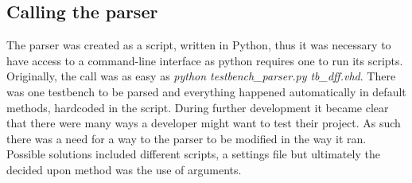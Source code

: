 \documentclass[11pt,british]{article}
\begin{document}
\subsection{Calling the parser}
The parser was created as a script, written in Python, thus it was necessary to have access to a command-line interface as python requires one to run its scripts. Originally, the call was as easy as \emph{python testbench\_parser.py tb\_dff.vhd}. There was one testbench to be parsed and everything happened automatically in default methods, hardcoded in the script. During further development it became clear that there were many ways a developer might want to test their project. As such there was a need for a way to the parser to be modified in the way it ran. Possible solutions included different scripts, a settings file but ultimately the decided upon method was the use of arguments.
\end{document}
